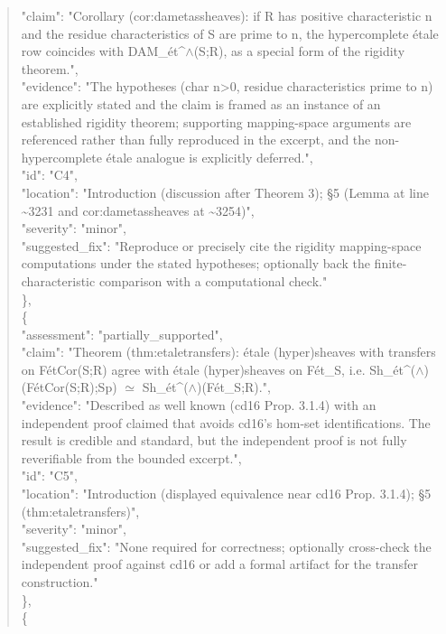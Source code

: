 \documentclass[11pt]{article}
\begin{document}
\begin{quote}
      "claim": "Corollary (cor:dametassheaves): if R has positive characteristic n and the residue characteristics of S are prime to n, the hypercomplete étale row coincides with DAM\_ét\^{}\ensuremath{\wedge}(S;R), as a special form of the rigidity theorem.",\\
      "evidence": "The hypotheses (char n>0, residue characteristics prime to n) are explicitly stated and the claim is framed as an instance of an established rigidity theorem; supporting mapping-space arguments are referenced rather than fully reproduced in the excerpt, and the non-hypercomplete étale analogue is explicitly deferred.",\\
      "id": "C4",\\
      "location": "Introduction (discussion after Theorem 3); §5 (Lemma at line \~{}3231 and cor:dametassheaves at \~{}3254)",\\
      "severity": "minor",\\
      "suggested\_fix": "Reproduce or precisely cite the rigidity mapping-space computations under the stated hypotheses; optionally back the finite-characteristic comparison with a computational check."\\
    \},\\
    \{\\
      "assessment": "partially\_supported",\\
      "claim": "Theorem (thm:etaletransfers): étale (hyper)sheaves with transfers on FétCor(S;R) agree with étale (hyper)sheaves on Fét\_S, i.e. Sh\_ét\^{}(\ensuremath{\wedge})(FétCor(S;R);Sp) \ensuremath{\simeq} Sh\_ét\^{}(\ensuremath{\wedge})(Fét\_S;R).",\\
      "evidence": "Described as well known (cd16 Prop. 3.1.4) with an independent proof claimed that avoids cd16's hom-set identifications. The result is credible and standard, but the independent proof is not fully reverifiable from the bounded excerpt.",\\
      "id": "C5",\\
      "location": "Introduction (displayed equivalence near cd16 Prop. 3.1.4); §5 (thm:etaletransfers)",\\
      "severity": "minor",\\
      "suggested\_fix": "None required for correctness; optionally cross-check the independent proof against cd16 or add a formal artifact for the transfer construction."\\
    \},\\
    \{\\

\end{quote}
\end{document}
